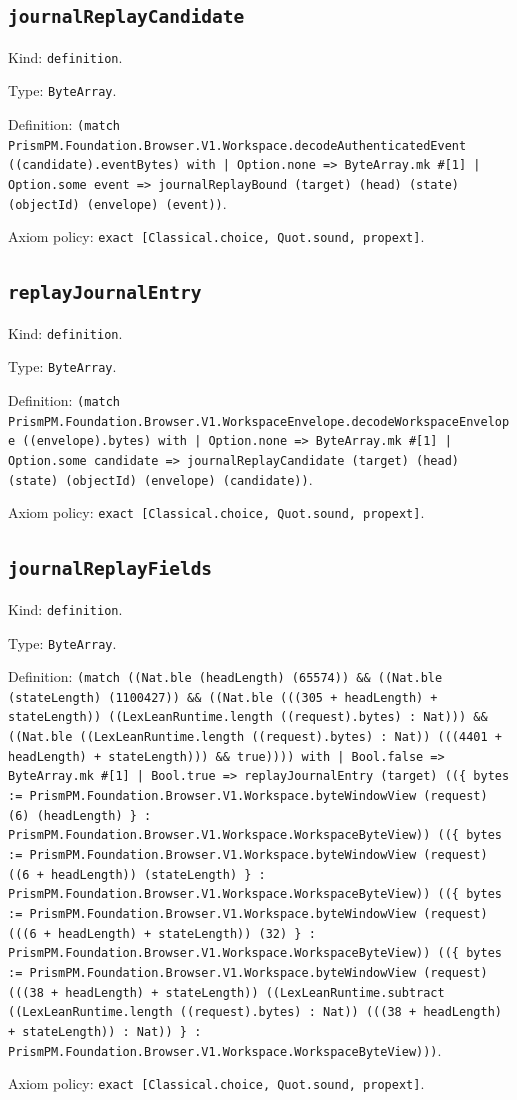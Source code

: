 \documentclass[11pt]{article}
\begin{document}
\subsection*{\texttt{journalReplayCandidate}}
\noindent Kind: \texttt{definition}.\par
\noindent Type: \texttt{ByteArray}.\par
\noindent Definition: \texttt{(match PrismPM.Foundation.Browser.V1.Workspace.decodeAuthenticatedEvent ((candidate).eventBytes) with | Option.none => ByteArray.mk \#[1] | Option.some event => journalReplayBound (target) (head) (state) (objectId) (envelope) (event))}.\par
\noindent Axiom policy: \texttt{exact [Classical.choice, Quot.sound, propext]}.\par
\subsection*{\texttt{replayJournalEntry}}
\noindent Kind: \texttt{definition}.\par
\noindent Type: \texttt{ByteArray}.\par
\noindent Definition: \texttt{(match PrismPM.Foundation.Browser.V1.WorkspaceEnvelope.decodeWorkspaceEnvelope ((envelope).bytes) with | Option.none => ByteArray.mk \#[1] | Option.some candidate => journalReplayCandidate (target) (head) (state) (objectId) (envelope) (candidate))}.\par
\noindent Axiom policy: \texttt{exact [Classical.choice, Quot.sound, propext]}.\par
\subsection*{\texttt{journalReplayFields}}
\noindent Kind: \texttt{definition}.\par
\noindent Type: \texttt{ByteArray}.\par
\noindent Definition: \texttt{(match ((Nat.ble (headLength) (65574)) \&\& ((Nat.ble (stateLength) (1100427)) \&\& ((Nat.ble (((305 + headLength) + stateLength)) ((LexLeanRuntime.length ((request).bytes) : Nat))) \&\& ((Nat.ble ((LexLeanRuntime.length ((request).bytes) : Nat)) (((4401 + headLength) + stateLength))) \&\& true)))) with | Bool.false => ByteArray.mk \#[1] | Bool.true => replayJournalEntry (target) ((\{ bytes := PrismPM.Foundation.Browser.V1.Workspace.byteWindowView (request) (6) (headLength) \} : PrismPM.Foundation.Browser.V1.Workspace.WorkspaceByteView)) ((\{ bytes := PrismPM.Foundation.Browser.V1.Workspace.byteWindowView (request) ((6 + headLength)) (stateLength) \} : PrismPM.Foundation.Browser.V1.Workspace.WorkspaceByteView)) ((\{ bytes := PrismPM.Foundation.Browser.V1.Workspace.byteWindowView (request) (((6 + headLength) + stateLength)) (32) \} : PrismPM.Foundation.Browser.V1.Workspace.WorkspaceByteView)) ((\{ bytes := PrismPM.Foundation.Browser.V1.Workspace.byteWindowView (request) (((38 + headLength) + stateLength)) ((LexLeanRuntime.subtract ((LexLeanRuntime.length ((request).bytes) : Nat)) (((38 + headLength) + stateLength)) : Nat)) \} : PrismPM.Foundation.Browser.V1.Workspace.WorkspaceByteView)))}.\par
\noindent Axiom policy: \texttt{exact [Classical.choice, Quot.sound, propext]}.\par
\end{document}
